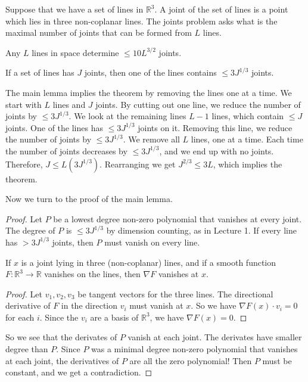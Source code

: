 Suppose that we have a set of lines in $\mathbb R^3$. A joint of the set of lines is a point which lies in three non-coplanar lines. The joints problem asks what is the maximal number of joints that can be formed from $L$ lines.

\begin{theorem}[0.1]
Any $L$ lines in space determine $\leq 10L^{3/2}$ joints.
\end{theorem}
\begin{lemma}
If a set of lines has $J$ joints, then one of the lines contains $\leq 3J^{1/3}$ joints.
\end{lemma}
The main lemma implies the theorem by removing the lines one at a time. We start with $L$ lines and $J$ joints. By cutting out one line, we reduce the number of joints by $\leq 3J^{1/3}$. We look at the remaining lines $L-1$ lines, which contain $\leq J$ joints. One of the lines has $\leq 3J^{1/3}$ joints on it. Removing this line, we reduce the number of joints by $\leq 3J^{1/3}$. We remove all $L$ lines, one at a time. Each time the number of joints decreases by $\leq 3J^{1/3}$, and we end up with no joints. Therefore, $J\leq L(3J^{1/3})$. Rearranging we get $J^{2/3}\leq 3L$, which implies the theorem.

Now we turn to the proof of the main lemma.
\begin{proof}
Let $P$ be a lowest degree non-zero polynomial that vanishes at every joint. The degree of $P$ is $\leq 3J^{1/3}$ by dimension counting, as in Lecture 1. If every line has $>3J^{1/3}$ joints, then $P$ must vanish on every line.

\begin{lemma}[0.2]
If $x$ is a joint lying in three (non-coplanar) lines, and if a smooth function $F:\mathbb R^3\to\mathbb R$ vanishes on the lines, then $\nabla F$ vanishes at $x$.
\end{lemma}
\begin{proof}
Let $v_1,v_2,v_3$ be tangent vectors for the three lines. The directional derivative of $F$ in the direction $v_i$ must vanish at $x$. So we have $\nabla F(x)\cdot v_i=0$ for each $i$. Since the $v_i$ are a basis of $\mathbb R^3$, we have $\nabla F(x)=0$.
\end{proof}
So we see that the derivates of $P$ vanish at each joint. The derivates have smaller degree than $P$. Since $P$ was a minimal degree non-zero polynomial that vanishes at each joint, the derivatives of $P$ are all the zero polynomial! Then $P$ must be constant, and we get a contradiction.
\end{proof}

